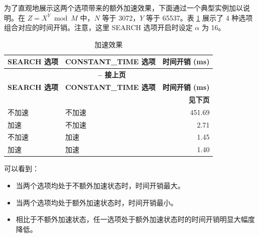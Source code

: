 \documentclass[main\_\_CN.tex]{subfiles}
\begin{document}
为了直观地展示这两个选项带来的额外加速效果，下面通过一个典型实例加以说明。在 \begin{math}Z = X^{Y} \bmod M\end{math} 中，\begin{math}N\end{math} 等于 3072，\begin{math}Y\end{math} 等于 65537。表 \ref{tab:accelerationeffect} 展示了 4 种选项组合对应的时间开销。注意，这里 SEARCH 选项开启时设定 \begin{math} \alpha \end{math} 为 16。

\begin{longtable}{ | l | l | r | }
    \caption{加速效果}\label{tab:accelerationeffect}
    \\\hline
    \rowcolor{lightgray}
    \textbf{SEARCH 选项} & \textbf{CONSTANT\_TIME 选项} & \textbf{时间开销 (ms)}  \\ \hline
    \endfirsthead

    \multicolumn{3}{c}{\bfseries \tablename\ \thetable{} -- 接上页}\\\hline

    \rowcolor{lightgray}
    \textbf{SEARCH 选项} & \textbf{CONSTANT\_TIME 选项} & \textbf{时间开销 (ms)}  \\ \hline
    \endhead

    \multicolumn{3}{r}{\textbf{见下页}} \\
    \endfoot
    \endlastfoot
    \hline

    不加速 & 不加速 & 451.69   \\ \hline
     加速 & 不加速 & 2.71      \\ \hline
     不加速 & 加速 & 1.45    \\ \hline
     加速 & 加速 & 1.40     \\ \hline
\end{longtable}

可以看到：
\begin{itemize}
    \item 当两个选项均处于不额外加速状态时，时间开销最大。
    \item 当两个选项均处于额外加速状态时，时间开销最小。
    \item 相比于不额外加速状态，任一选项处于额外加速状态时的时间开销明显大幅度降低。
\end{itemize}

\clearpage
\end{document}
